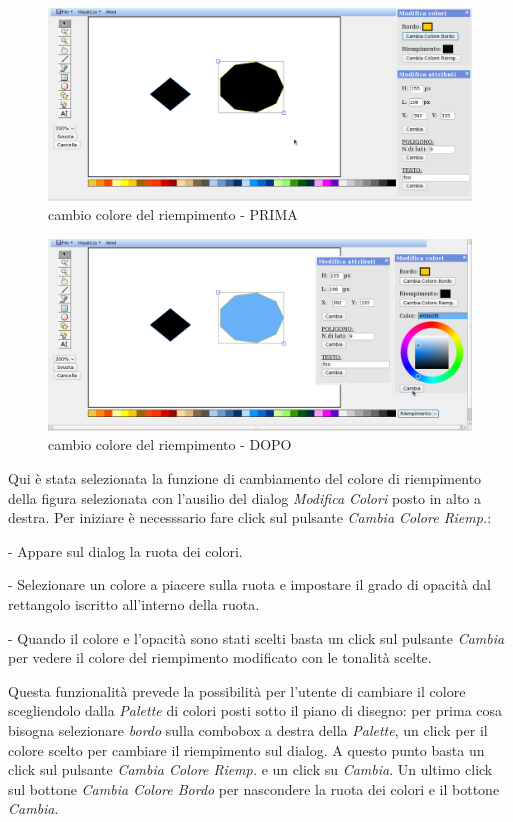 \begin{figure}[!ht]
\centering
\includegraphics[scale=4]{images/colore_riempimento_prima.png}
\caption{cambio colore del riempimento  - PRIMA}
\end{figure} 

\begin{figure}[!ht]
\centering
\includegraphics[scale=4]{images/colore_riempimento_dopo.png}
\caption{cambio colore del riempimento  - DOPO}
\end{figure} 


\vspace{100pt}
Qui \`e stata selezionata la funzione di cambiamento del colore di riempimento della figura selezionata con l'ausilio del dialog \textit{Modifica Colori} posto in alto a destra. Per iniziare \`e necesssario fare click sul pulsante \textit{Cambia Colore Riemp.}: 
\begin{elencopuntato}[\normindent]
\item[-] Appare sul dialog la ruota dei colori.
\item[-] Selezionare un colore a piacere sulla ruota e impostare il grado di opacit\`a dal rettangolo iscritto all'interno della ruota. 
\item[-]Quando il colore e l'opacit\`a sono stati scelti basta un click sul pulsante \textit{Cambia} per vedere il colore del riempimento modificato con le tonalit\`a scelte. 
\end{elencopuntato}
Questa funzionalit\`a prevede la possibilit\`a per l'utente di cambiare il colore scegliendolo dalla \textit{Palette} di colori posti sotto il piano di disegno: per prima cosa bisogna selezionare \textit{bordo} sulla combobox a destra della \textit{Palette}, un click per il colore scelto per cambiare il riempimento sul dialog. A questo punto basta un click sul pulsante \textit{Cambia Colore Riemp.} e un click su \textit{Cambia}.
Un ultimo click sul bottone \textit{Cambia Colore Bordo} per nascondere la ruota dei colori e il bottone \textit{Cambia}.

